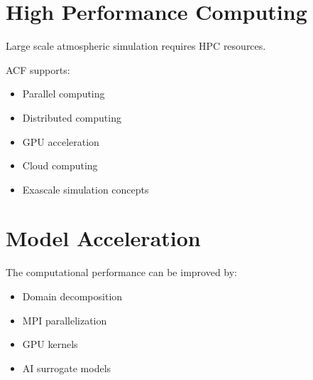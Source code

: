 \section{High Performance Computing}

Large scale atmospheric simulation requires HPC resources.

ACF supports:

\begin{itemize}
\item Parallel computing
\item Distributed computing
\item GPU acceleration
\item Cloud computing
\item Exascale simulation concepts
\end{itemize}



\section{Model Acceleration}

The computational performance can be improved by:

\begin{itemize}
\item Domain decomposition
\item MPI parallelization
\item GPU kernels
\item AI surrogate models
\end{itemize}
